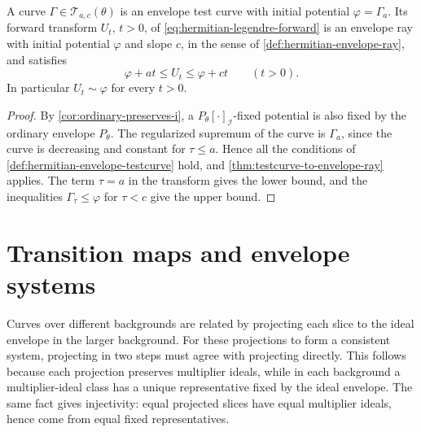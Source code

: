 \begin{proposition}\label{prop:bounded-left-i-ray}
A curve $\Gamma\in\mathscr T_{a,c}(\theta)$ is an envelope test curve with initial potential $\varphi=\Gamma_a$. Its forward transform $U_t$, $t>0$, of \eqref{eq:hermitian-legendre-forward} is an envelope ray with initial potential $\varphi$ and slope $c$, in the sense of \cref{def:hermitian-envelope-ray}, and satisfies
\[
 \varphi+at\leq U_t\leq\varphi+ct\qquad(t>0).
\]
In particular $U_t\sim\varphi$ for every $t>0$.
\end{proposition}
\begin{proof}
By \cref{cor:ordinary-preserves-i}, a $P_\theta[\cdot]_{\mathcal I}$-fixed potential is also fixed by the ordinary envelope $P_\theta$. The regularized supremum of the curve is $\Gamma_a$, since the curve is decreasing and constant for $\tau\leq a$. Hence all the conditions of \cref{def:hermitian-envelope-testcurve} hold, and \cref{thm:testcurve-to-envelope-ray} applies. The term $\tau=a$ in the transform gives the lower bound, and the inequalities $\Gamma_\tau\leq\varphi$ for $\tau<c$ give the upper bound.
\end{proof}

\section{Transition maps and envelope systems}
\label{sec:envelope-system-transitions}

Curves over different backgrounds are related by projecting each slice to the ideal envelope in the larger background. For these projections to form a consistent system, projecting in two steps must agree with projecting directly. This follows because each projection preserves multiplier ideals, while in each background a multiplier-ideal class has a unique representative fixed by the ideal envelope. The same fact gives injectivity: equal projected slices have equal multiplier ideals, hence come from equal fixed representatives.

